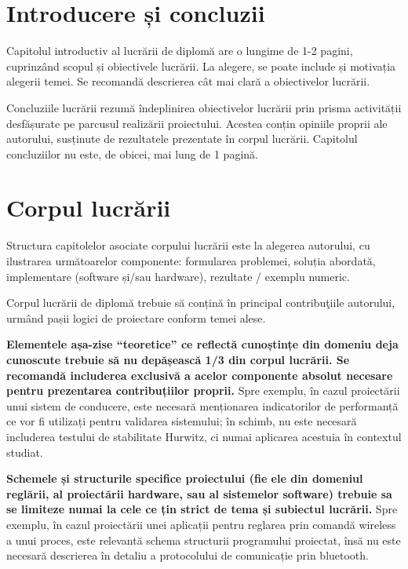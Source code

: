 \section{Introducere și concluzii}

Capitolul introductiv al lucrării de diplomă are o lungime de 1-2 pagini, cuprinzând scopul și obiectivele lucrării. La alegere, se poate include și motivația alegerii temei. Se recomandă descrierea cât mai clară a obiectivelor lucrării.

Concluziile lucrării rezumă îndeplinirea obiectivelor lucrării prin prisma activității desfășurate pe parcusul realizării proiectului. Acestea conțin opiniile proprii ale autorului, susținute de rezultatele prezentate în corpul lucrării. Capitolul concluziilor nu este, de obicei, mai lung de 1 pagină.

\section{Corpul lucrării}

Structura capitolelor asociate corpului lucrării este la alegerea autorului, cu ilustrarea următoarelor componente: formularea problemei, soluția abordată, implementare (software și/sau hardware), rezultate / exemplu numeric.

Corpul lucrării de diplomă trebuie să conțină în principal contribuţiile autorului, urmând pașii logici de proiectare conform temei alese.

\textbf{Elementele așa-zise ``teoretice'' ce reflectă cunoștințe din domeniu deja cunoscute trebuie să nu depășească 1/3 din corpul lucrării. Se recomandă includerea exclusivă a acelor componente absolut necesare pentru prezentarea contribuțiilor proprii.} Spre exemplu, în cazul proiectării unui sistem de conducere, este necesară menționarea indicatorilor de performanță ce vor fi utilizați pentru validarea sistemului; în schimb, nu este necesară includerea testului de stabilitate Hurwitz, ci numai aplicarea acestuia în contextul studiat.

\textbf{Schemele și structurile specifice proiectului (fie ele din domeniul reglării, al proiectării hardware, sau al sistemelor software) trebuie sa se limiteze numai la cele ce țin strict de tema și subiectul lucrării.} Spre exemplu, în cazul proiectării unei aplicații pentru reglarea prin comandă wireless a unui proces, este relevantă schema structurii programului proiectat, însă nu este necesară descrierea în detaliu a protocolului de comunicație prin bluetooth. 

